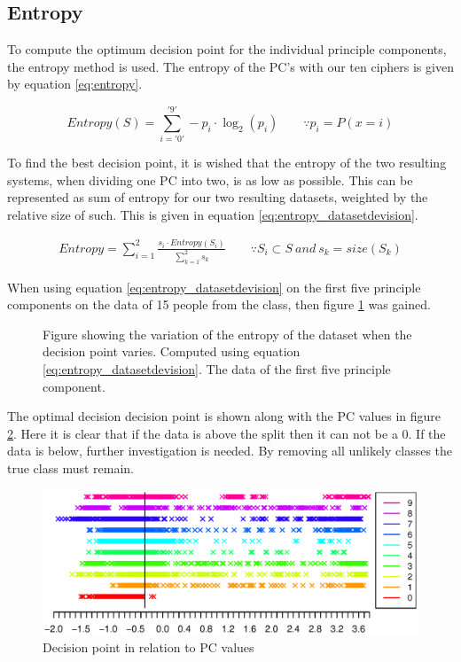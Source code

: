 \subsection{Entropy}
To compute the optimum decision point for the individual principle components, the entropy method is used.
The entropy of the PC's with our ten ciphers is given by equation \ref{eq:entropy}.

\begin{equation}
Entropy(S) = \sum_{i = '0'}^{'9'} -p_i \cdot \log_2(p_i) 
\qquad \because p_i = P(x = i)
\label{eq:entropy}
\end{equation}

To find the best decision point, it is wished that the entropy of the two resulting systems, when dividing one PC into two, is as low as possible.
This can be represented as sum of entropy for our two resulting datasets, weighted by the relative size of such.
This is given in equation \ref{eq:entropy_datasetdevision}.

\begin{eqnarray}
Entropy = \sum_{i = 1}^{2} \frac{s_i \cdot Entropy(S_i)}{\sum_{k = 1}^{2} s_k} 
\qquad \because S_i \subset S\ and\ s_k = size(S_k)
\label{eq:entropy_datasetdevision}
\end{eqnarray}

When using equation \ref{eq:entropy_datasetdevision} on the first five principle components on the data of 15 people from the class, then figure \ref{fig:entropy_pc5} was gained.

\begin{figure}[H]
\centering
\caption{Figure showing the variation of the entropy of the dataset when the decision point varies. Computed using equation \ref{eq:entropy_datasetdevision}. The data of the first five principle component.}
\label{fig:entropy_pc5}
\end{figure}

The optimal decision decision point is shown along with the PC values in figure \ref{fig:decision_point}. 
Here it is clear that if the data is above the split then it can not be a 0.
If the data is below, further investigation is needed.
By removing all unlikely classes the true class must remain.

\begin{figure}[H]
\includegraphics[width = \textwidth]{graphics/decision_seperation}
\caption{Decision point in relation to PC values}
\label{fig:decision_point}
\end{figure}

